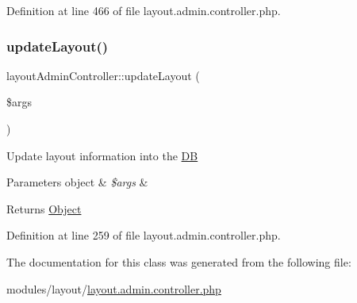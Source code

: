 Definition at line 466 of file layout.\+admin.\+controller.\+php.

\hypertarget{classlayoutAdminController_a7eec8ee6d2626ef89b08eb67af6638de}{}\label{classlayoutAdminController_a7eec8ee6d2626ef89b08eb67af6638de} 
\subsubsection{\texorpdfstring{update\+Layout()}{updateLayout()}}
{\footnotesize\ttfamily layout\+Admin\+Controller\+::update\+Layout (\begin{DoxyParamCaption}\item[{}]{\$args }\end{DoxyParamCaption})}

Update layout information into the \hyperlink{classDB}{DB} 
\begin{DoxyParams}[1]{Parameters}
object & {\em \$args} & \\
\hline
\end{DoxyParams}
\begin{DoxyReturn}{Returns}
\hyperlink{classObject}{Object} 
\end{DoxyReturn}


Definition at line 259 of file layout.\+admin.\+controller.\+php.



The documentation for this class was generated from the following file\+:\begin{DoxyCompactItemize}
\item 
modules/layout/\hyperlink{layout_8admin_8controller_8php}{layout.\+admin.\+controller.\+php}\end{DoxyCompactItemize}
